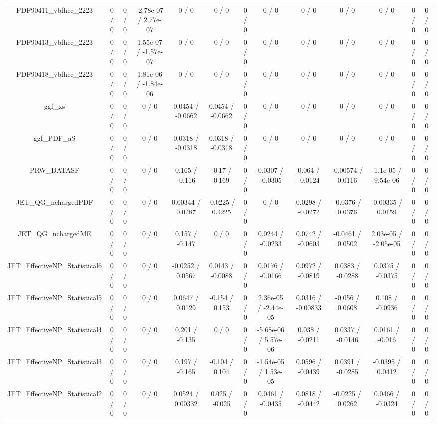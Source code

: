 \documentclass[10pt]{article}
\begin{document}
\begin{table}[htbp]
\begin{center}
\begin{tabular}{|c|c|c|c|c|c|c|c|c|c|c|c|c|}
  PDF90411_vbfhcc_2223 & 0 / 0 & 0 / 0 & -2.78e-07 / 2.77e-07 & 0 / 0 & 0 / 0 & 0 / 0 & 0 / 0 & 0 / 0 & 0 / 0 & 0 / 0 & 0 / 0 & 0 / 0 \\ 
  PDF90413_vbfhcc_2223 & 0 / 0 & 0 / 0 & 1.55e-07 / -1.57e-07 & 0 / 0 & 0 / 0 & 0 / 0 & 0 / 0 & 0 / 0 & 0 / 0 & 0 / 0 & 0 / 0 & 0 / 0 \\ 
  PDF90418_vbfhcc_2223 & 0 / 0 & 0 / 0 & 1.81e-06 / -1.84e-06 & 0 / 0 & 0 / 0 & 0 / 0 & 0 / 0 & 0 / 0 & 0 / 0 & 0 / 0 & 0 / 0 & 0 / 0 \\ 
  ggf_xs & 0 / 0 & 0 / 0 & 0 / 0 & 0.0454 / -0.0662 & 0.0454 / -0.0662 & 0 / 0 & 0 / 0 & 0 / 0 & 0 / 0 & 0 / 0 & 0 / 0 & 0 / 0 \\ 
  ggf_PDF_aS & 0 / 0 & 0 / 0 & 0 / 0 & 0.0318 / -0.0318 & 0.0318 / -0.0318 & 0 / 0 & 0 / 0 & 0 / 0 & 0 / 0 & 0 / 0 & 0 / 0 & 0 / 0 \\ 
  PRW_DATASF & 0 / 0 & 0 / 0 & 0 / 0 & 0.165 / -0.116 & -0.17 / 0.169 & 0 / 0 & 0.0307 / -0.0305 & 0.064 / -0.0124 & -0.00574 / 0.0116 & -1.1e-05 / 9.54e-06 & 0 / 0 & 0 / 0 \\ 
  JET_QG_nchargedPDF & 0 / 0 & 0 / 0 & 0 / 0 & 0.00344 / 0.0287 & -0.0225 / 0.0225 & 0 / 0 & 0 / 0 & 0.0298 / -0.0272 & -0.0376 / 0.0376 & -0.00335 / 0.0159 & 0 / 0 & 0 / 0 \\ 
  JET_QG_nchargedME & 0 / 0 & 0 / 0 & 0 / 0 & 0.157 / -0.147 & 0 / 0 & 0 / 0 & 0.0244 / -0.0233 & 0.0742 / -0.0603 & -0.0461 / 0.0502 & 2.03e-05 / -2.05e-05 & 0 / 0 & 0 / 0 \\ 
  JET_EffectiveNP_Statistical6 & 0 / 0 & 0 / 0 & 0 / 0 & -0.0252 / 0.0567 & 0.0143 / -0.0088 & 0 / 0 & 0.0176 / -0.0166 & 0.0972 / -0.0819 & 0.0383 / -0.0288 & 0.0375 / -0.0375 & 0 / 0 & 0 / 0 \\ 
  JET_EffectiveNP_Statistical5 & 0 / 0 & 0 / 0 & 0 / 0 & 0.0647 / 0.0129 & -0.154 / 0.153 & 0 / 0 & 2.36e-05 / -2.44e-05 & 0.0316 / -0.00833 & -0.056 / 0.0608 & 0.108 / -0.0936 & 0 / 0 & 0 / 0 \\ 
  JET_EffectiveNP_Statistical4 & 0 / 0 & 0 / 0 & 0 / 0 & 0.201 / -0.135 & 0 / 0 & 0 / 0 & -5.68e-06 / 5.57e-06 & 0.038 / -0.0211 & 0.0337 / -0.0146 & 0.0161 / -0.016 & 0 / 0 & 0 / 0 \\ 
  JET_EffectiveNP_Statistical3 & 0 / 0 & 0 / 0 & 0 / 0 & 0.197 / -0.165 & -0.104 / 0.104 & 0 / 0 & -1.54e-05 / 1.53e-05 & 0.0596 / -0.0439 & 0.0391 / -0.0285 & -0.0395 / 0.0412 & 0 / 0 & 0 / 0 \\ 
  JET_EffectiveNP_Statistical2 & 0 / 0 & 0 / 0 & 0 / 0 & 0.0524 / 0.00332 & 0.025 / -0.025 & 0 / 0 & 0.0461 / -0.0435 & 0.0818 / -0.0442 & -0.0225 / 0.0262 & 0.0466 / -0.0324 & 0 / 0 & 0 / 0 \\ 

\end{tabular}
\end{center}
\end{table}
\end{document}
